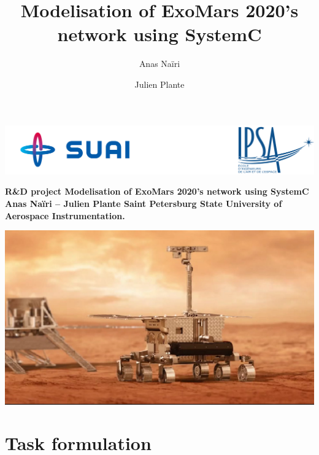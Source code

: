 \documentclass[12pt,a4paper]{article}
\author{Anas Naïri \and Julien Plante}
\title{Modelisation of ExoMars 2020's network using SystemC}
\begin{document}
\begin{titlepage}
\includegraphics[scale=.2]{pictures/header.png}

    \vspace*{\fill}

    \begin{center}
    
        \Huge\bfseries
        R\&D project
        \vskip10pt
        \Large\bfseries
        Modelisation of ExoMars 2020's network using SystemC
        \vskip10pt
        \large
        Anas Naïri \:\---\: Julien Plante
        \vskip20pt
        \large
        Saint Petersburg State University of Aerospace Instrumentation.
        \vskip20pt
        
        \vspace*{\fill}
        \includegraphics[scale = 0.2]{pictures/Exomars2020.png}
    \end{center}
    
    \vspace*{\fill}

\end{titlepage}

\pagebreak

\tableofcontents

\pagebreak

\section{Task formulation}
\end{document}
